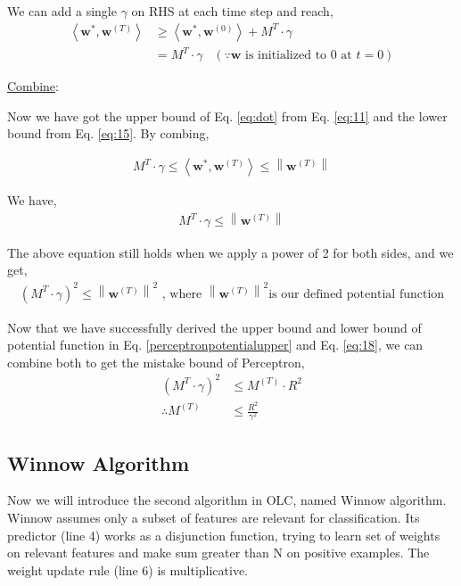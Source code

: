 \documentclass[11pt]{article}
\begin{document}
{{We can add a single $\gamma$ on RHS at each time step and reach, 
\begin{align}
    \left\langle\boldsymbol{w}^{*}, \boldsymbol{w}^{(T)}\right\rangle &\geq\left\langle\boldsymbol{w}^{*}, \boldsymbol{w}^{(0)}\right\rangle + M^{T}\cdot\gamma \nonumber \\ 
    &= M^{T} \cdot \gamma \;\;\;(\because \boldsymbol{w}  \text{ is initialized to 0 at } t=0)
    \label{eq:15}
\end{align}

\underline{Combine}:

Now we have got the upper bound of Eq. \ref{eq:dot} from Eq. \ref{eq:11} and the lower bound from Eq.  \ref{eq:15}. By combing, 

\begin{align}
    M^{T} \cdot \gamma \leq 
    \left\langle\boldsymbol{w}^{*}, \boldsymbol{w}^{(T)}\right\rangle
    \leq \left\|\boldsymbol{w}^{(T)}\right\|
\end{align}

We have,
\begin{align}
     M^{T} \cdot \gamma \leq \left\|\boldsymbol{w}^{(T)}\right\|
\end{align}

The above equation still holds when we apply a power of 2 for both sides, and we get,
\begin{align}
     {(M^{T} \cdot \gamma)}^{2} \leq {\left\|\boldsymbol{w}^{(T)}\right\|}^{2} \text { , where } {\left\|\boldsymbol{w}^{(T)}\right\|}^{2} \text{is our defined potential function}
     \label{eq:18}
\end{align}
}

Now that we have successfully derived the upper bound and lower bound of potential function in Eq. \ref{perceptronpotentialupper} and Eq. \ref{eq:18}, we can combine both to get the mistake bound of Perceptron,
\begin{align}
    {(M^{T} \cdot \gamma)}^{2} &\leq 
    M^{(T)}\cdot R^2 \nonumber \\
    \therefore M^{(T)} &\leq \frac{R^{2}}{\gamma^{2}}
 \end{align}

}



\subsection{Winnow Algorithm}
\label{section:winnow}
\normalfont Now we will introduce the second algorithm in OLC, named Winnow algorithm. Winnow assumes only a subset of features are relevant for classification. Its predictor (line 4) works as a disjunction function, trying to learn set of weights on relevant features and make sum greater than N on positive examples. The weight update rule (line 6) is multiplicative.
\end{document}
